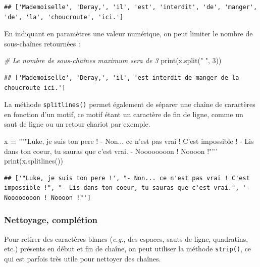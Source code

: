 \documentclass[12pt,]{book}
\newenvironment{Shaded}{\begin{snugshade}}{\end{snugshade}}
\newcommand{\DecValTok}[1]{\textcolor[rgb]{0.00,0.00,0.81}{#1}}
\newcommand{\StringTok}[1]{\textcolor[rgb]{0.31,0.60,0.02}{#1}}
\newcommand{\CommentTok}[1]{\textcolor[rgb]{0.56,0.35,0.01}{\textit{#1}}}
\newcommand{\OperatorTok}[1]{\textcolor[rgb]{0.81,0.36,0.00}{\textbf{#1}}}
\newcommand{\BuiltInTok}[1]{#1}
\newcommand{\NormalTok}[1]{#1}
\numberwithin{equation}{section}
\numberwithin{countremarque}{section}
\begin{document}
\begin{lstlisting}
## ['Mademoiselle', 'Deray,', 'il', 'est', 'interdit', 'de', 'manger', 'de', 'la', 'choucroute', 'ici.']
\end{lstlisting}

En indiquant en paramètres une valeur numérique, on peut limiter le
nombre de sous-chaînes retournées :

\begin{Shaded}
\begin{Highlighting}[]
\CommentTok{# Le nombre de sous-chaînes maximum sera de 3}
\BuiltInTok{print}\NormalTok{(x.split(}\StringTok{" "}\NormalTok{, }\DecValTok{3}\NormalTok{))}
\end{Highlighting}
\end{Shaded}

\begin{lstlisting}
## ['Mademoiselle', 'Deray,', 'il', 'est interdit de manger de la choucroute ici.']
\end{lstlisting}

La méthode \texttt{splitlines()} permet également de séparer une chaîne
de caractères en fonction d'un motif, ce motif étant un caractère de fin
de ligne, comme un saut de ligne ou un retour chariot par exemple.

\begin{Shaded}
\begin{Highlighting}[]
\NormalTok{x }\OperatorTok{=} \StringTok{'''"Luke, je suis ton pere !}
\StringTok{- Non... ce n'est pas vrai ! C'est impossible !}
\StringTok{- Lis dans ton coeur, tu sauras que c'est vrai.}
\StringTok{- Noooooooon ! Noooon !"'''}
\BuiltInTok{print}\NormalTok{(x.splitlines())}
\end{Highlighting}
\end{Shaded}

\begin{lstlisting}
## ['"Luke, je suis ton pere !', "- Non... ce n'est pas vrai ! C'est impossible !", "- Lis dans ton coeur, tu sauras que c'est vrai.", '- Noooooooon ! Noooon !"']
\end{lstlisting}

\subsubsection{Nettoyage, complétion}\label{nettoyage-completion}

Pour retirer des caractères blancs (\emph{e.g.}, des espaces, sauts de
ligne, quadratins, etc.) présents en début et fin de chaîne, on peut
utiliser la méthode \texttt{strip()}, ce qui est parfois très utile pour
nettoyer des chaînes.
\end{document}
